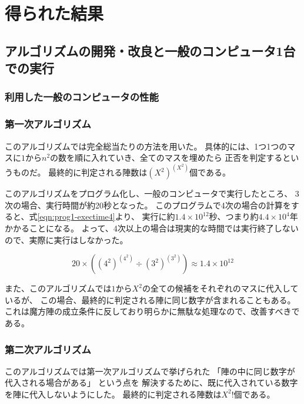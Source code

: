 \section{得られた結果}
\subsection{アルゴリズムの開発・改良と一般のコンピュータ1台での実行}
\subsubsection{利用した一般のコンピュータの性能}
\subsubsection{第一次アルゴリズム}
このアルゴリズムでは完全総当たりの方法を用いた。
具体的には、1つ1つのマスに$1$から$n^2$の数を順に入れていき、全てのマスを埋めたら
正否を判定するというものだ。
最終的に判定される陣数は$(X^2)^{(X^2)}$個である。

このアルゴリズムをプログラム化し、一般のコンピュータで実行したところ、
3次の場合、実行時間が約20秒となった。
このプログラムで4次の場合の計算をすると、式\ref{eqn:prog1-exectime4}より、
実行に約$1.4 \times 10^{12}$秒、つまり約$4.4 \times 10^4$年かかることになる。
よって、4次以上の場合は現実的な時間では実行終了しないので、実際に実行はしなかった。

\begin{equation} \label{eqn:prog1-exectime4}
20 \times ((4^2)^{(4^2)} \div (3^2)^{(3^2)}) \approx 1.4 \times 10^{12}
\end{equation}

また、このアルゴリズムでは$1$から$X^2$の全ての候補をそれぞれのマスに代入しているが、
この場合、最終的に判定される陣に同じ数字が含まれることもある。
これは魔方陣の成立条件に反しており明らかに無駄な処理なので、改善すべきである。


\subsubsection{第二次アルゴリズム}
このアルゴリズムでは第一次アルゴリズムで挙げられた
「陣の中に同じ数字が代入される場合がある」
という点を
解決するために、既に代入されている数字を陣に代入しないようにした。
最終的に判定される陣数は$X^2!$個である。

